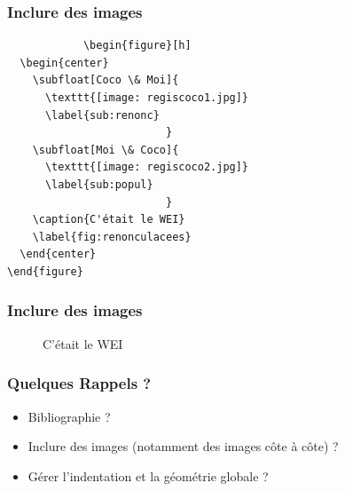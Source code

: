 \documentclass[handout]{beamer}
\begin{document}
	\begin{frame}[fragile=singleslide]
		\frametitle{Inclure des images}

		\begin{verbatim}
			\begin{figure}[h]
  \begin{center}
	\subfloat[Coco \& Moi]{
	  \texttt{[image: regiscoco1.jpg]}
	  \label{sub:renonc}
						 }
	\subfloat[Moi \& Coco]{
	  \texttt{[image: regiscoco2.jpg]}
	  \label{sub:popul}
						 }
	\caption{C'était le WEI}
	\label{fig:renonculacees}
  \end{center}
\end{figure}
		\end{verbatim}

	\end{frame}

	\begin{frame}
		\frametitle{Inclure des images}

		\begin{figure}[h]
\begin{center}
\caption{C'était le WEI}
\label{fig:cocomoi}
\end{center}
\end{figure}
	\end{frame}

	\begin{frame}
		\frametitle{Quelques Rappels ?}
		\begin{itemize}
			\item Bibliographie ?
			\item Inclure des images (notamment des images côte à côte) ?
			\item Gérer l'indentation et la géométrie globale ?
		\end{itemize}
	\end{frame}
\end{document}
